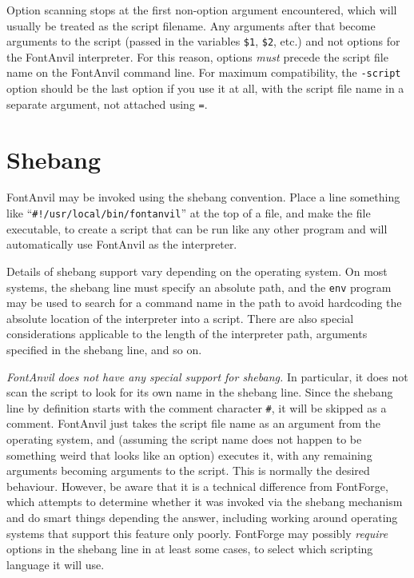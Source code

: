 \begin{framed}
Option scanning stops at the first non-option argument encountered, which
will usually be treated as the script filename.  Any arguments after that
become arguments to the script (passed in the variables \texttt{\$1},
\texttt{\$2}, etc.) and not options for the FontAnvil interpreter.  For this
reason, options \emph{must} precede the script file name on the FontAnvil
command line.  For maximum compatibility, the \texttt{-script} option should
be the last option if you use it at all, with the script file name in a
separate argument, not attached using \texttt{=}.
\end{framed}

\section{Shebang}

FontAnvil may be invoked using the shebang convention.  Place a line
something like ``\texttt{\#!/usr/local/bin/fontanvil}'' at the top of a
file, and make the file executable, to create a script that can be run like
any other program and will automatically use FontAnvil as the interpreter.

Details of shebang support vary depending on the operating system.  On most
systems, the shebang line must specify an absolute path, and the
\texttt{env} program may be used to search for a command name in the path to
avoid hardcoding the absolute location of the interpreter into a script. 
There are also special considerations applicable to the length of the
interpreter path, arguments specified in the shebang line, and so on. 

\emph{FontAnvil does not have any special support for shebang.}  In
particular, it does not scan the script to look for its own name in the
shebang line.  Since the shebang line by definition starts with the comment
character \texttt{\#}, it will be skipped as a comment.  FontAnvil just
takes the script file name as an argument from the operating system, and
(assuming the script name does not happen to be something weird that looks
like an option) executes it, with any remaining arguments becoming arguments
to the script.  This is normally the desired behaviour.  However, be
\FFdiff aware
that it is a technical difference from FontForge, which attempts to
determine whether it was invoked via the shebang mechanism and do smart
things depending the answer, including working around operating systems that
support this feature only poorly.  FontForge may possibly \emph{require}
options in the shebang line in at least some cases, to select which
scripting language it will use.

